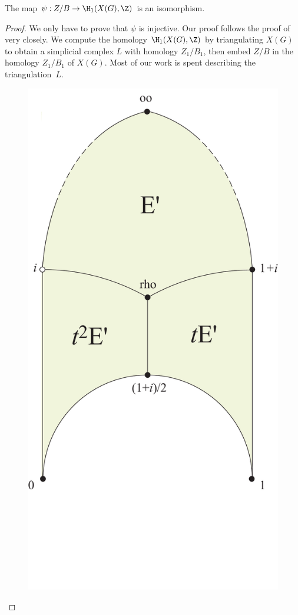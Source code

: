 \documentclass{report}
\begin{document}
\begin{theorem}[Manin]\label{thm:maninsymbols}
The map $\psi: Z/B\to \H_1(X(G),\Z)$ is an isomorphism.
\end{theorem}
\begin{proof}
We only have to prove that $\psi$ is injective.  Our proof follows
the proof of \cite[Thm.~1.9]{manin:parabolic} very closely.   We
compute the homology $\H_1(X(G),\Z)$ by triangulating $X(G)$ to
obtain a simplicial complex $L$ with homology $Z_1/B_1$, then
embed $Z/B$ in the homology $Z_1/B_1$ of $X(G)$.  Most of our work
is spent describing the triangulation~$L$.

\begin{figure}
\begin{center}
\includegraphics[height=0.4\textheight]{graphics/manin_symbol_proof}\vspace{-1in}

\end{center}
\end{figure}
\end{proof}
\end{document}
